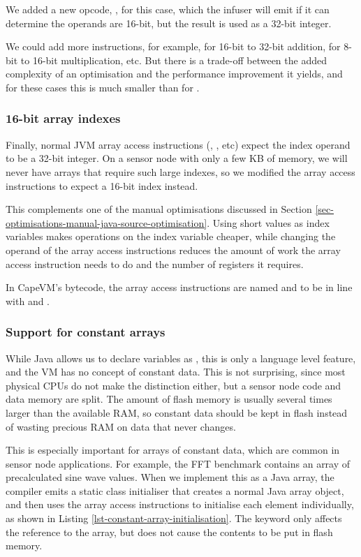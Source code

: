 We added a new opcode, , for this case, which the infuser will emit if it can determine the operands are 16-bit, but the result is used as a 32-bit integer.

We could add more instructions, for example,  for 16-bit to 32-bit addition,  for 8-bit to 16-bit multiplication, etc. But there is a trade-off between the added complexity of an optimisation and the performance improvement it yields, and for these cases this is much smaller than for .

\subsubsection{16-bit array indexes}
Finally, normal JVM array access instructions (, , etc) expect the index operand to be a 32-bit integer. On a sensor node with only a few KB of memory, we will never have arrays that require such large indexes, so we modified the array access instructions to expect a 16-bit index instead. 

This complements one of the manual optimisations discussed in Section \ref{sec-optimisations-manual-java-source-optimisation}. Using short values as index variables makes operations on the index variable cheaper, while changing the operand of the array access instructions reduces the amount of work the array access instruction needs to do and the number of registers it requires.

In CapeVM's bytecode, the array access instructions are named  and  to be in line with  and .

\subsubsection{Support for constant arrays}
\label{sec-opt-constant-arrays}
While Java allows us to declare variables as , this is only a language level feature, and the VM has no concept of constant data. This is not surprising, since most physical CPUs do not make the distinction either, but a sensor node code and data memory are split. The amount of flash memory is usually several times larger than the available RAM, so constant data should be kept in flash instead of wasting precious RAM on data that never changes.

This is especially important for arrays of constant data, which are common in sensor node applications. For example, the FFT benchmark contains an array of precalculated sine wave values. When we implement this as a  Java array, the compiler emits a static class initialiser that creates a normal Java array object, and then uses the array access instructions to initialise each element individually, as shown in Listing \ref{lst-constant-array-initialisation}. The  keyword only affects the reference to the  array, but does not cause the contents to be put in flash memory.


